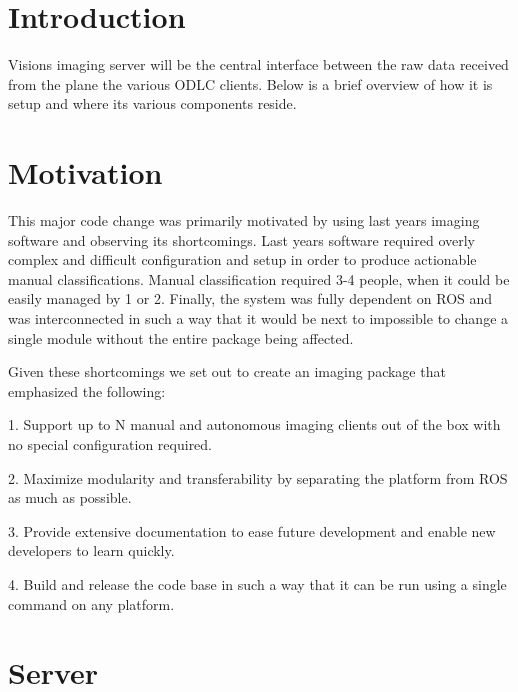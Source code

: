 \documentclass[]{auvsi_doc}
\begin{document}
\begin{AUVSITitlePage}
\begin{artifacttable}
\end{artifacttable}
\end{AUVSITitlePage}

\section{Introduction}

Visions imaging server will be the central interface between the raw data received from the plane 
the various ODLC clients. Below is a brief overview of how it is setup and where its various components reside.

\section{Motivation}

This major code change was primarily motivated by using last years imaging
software and observing its shortcomings. Last years software required overly 
complex and difficult configuration and setup in order to produce actionable 
manual classifications. Manual classification  required 3-4 people, when it 
could be easily managed by 1 or 2. Finally, the system was fully dependent 
on ROS and was interconnected in such a way that it would be next to impossible to change
a single module without the entire package being affected.

Given these shortcomings we set out to create an imaging package that emphasized
the following:

1. Support up to N manual and autonomous imaging clients out of the box with no 
special configuration required.

2. Maximize modularity and transferability by separating the platform from ROS as 
much as possible.

3. Provide extensive documentation to ease future development and enable new developers
to learn quickly.

4. Build and release the code base in such a way that it can be run using a single command
on any platform.

\section{Server}
\end{document}
